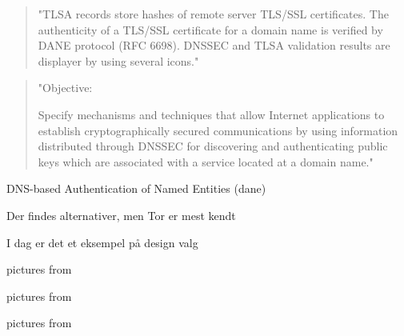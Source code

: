 \documentclass[Screen16to9,17pt]{foils}
\begin{document}


\begin{quote}
"TLSA records store hashes of remote server TLS/SSL certificates. The authenticity of a TLS/SSL certificate for a domain name is verified by DANE protocol (RFC 6698). DNSSEC and TLSA validation results are displayer by using several icons."
\end{quote}



\begin{quote}
"Objective:

Specify mechanisms and techniques that allow Internet applications to
establish cryptographically secured communications by using information
distributed through DNSSEC for discovering and authenticating public
keys which are associated with a service located at a domain name."
\end{quote}

\begin{list1}
\item DNS-based Authentication of Named Entities (dane)
\end{list1}



\centerline{}

\centerline{Der findes alternativer, men Tor er mest kendt}

I dag er det et eksempel på design valg



\centerline{pictures from }



\centerline{pictures from }



\centerline{pictures from }
\end{document}
